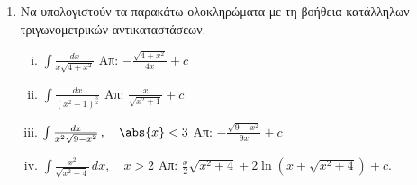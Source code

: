 



\begin{center}
\end{center}

\vspace{2\baselineskip}
\everymath{\displaystyle}
\pagestyle{empty}



\begin{enumerate}

\item Να υπολογιστούν τα παρακάτω ολοκληρώματα με τη βοήθεια κατάλληλων τριγωνομετρικών αντικαταστάσεων.

\begin{enumerate}[i)]

\item $\int\frac{dx}{x\sqrt{4+x^2}}$ \hfill Απ: $-\frac{\sqrt{4+x^2}}{4x}+c$
\item $\int\frac{dx}{(x^2+1)^{\frac{3}{2}}}$ \hfill Απ: $\frac{x}{\sqrt{x^2+1}}+c$
\item $\int\frac{dx}{x^2\sqrt{9-x^2}}\,,\quad \abs{x}<3$ \hfill Απ: $-\frac{\sqrt{9-x^2}}{9x}+c$
\item $\int\frac{x^2}{\sqrt{x^2-4}}\,dx,\quad x>2$ \hfill Απ: $\frac{x}{2}\sqrt{x^2+4}+2\ln(x+\sqrt{x^2+4})+c$.

\end{enumerate}

\end{enumerate}

